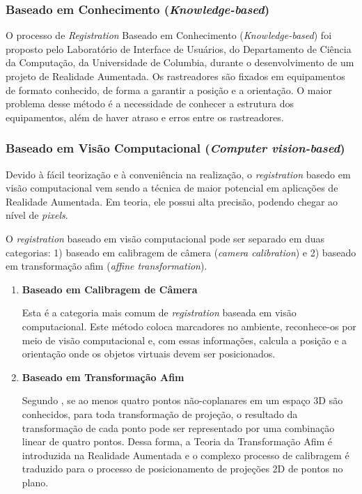 \subsubsection{Baseado em Conhecimento (\textit{Knowledge-based})}


O processo de \textit{Registration} Baseado em Conhecimento (\textit{Knowledge-based}) foi
proposto pelo Laboratório de Interface de Usuários, do Departamento de Ciência da Computação, 
da Universidade de Columbia, durante o desenvolvimento de um projeto de Realidade Aumentada.
Os rastreadores são fixados em equipamentos de formato conhecido, de forma a garantir a posição
e a orientação. O maior problema desse método é a necessidade de conhecer a estrutura dos equipamentos,
além de haver atraso e erros entre os rastreadores.



\subsubsection{Baseado em Visão Computacional (\textit{Computer vision-based})}

Devido à fácil teorização e à conveniência na realização, o \textit{registration} basedo em visão computacional
vem sendo a técnica de maior potencial em aplicações de Realidade Aumentada. Em teoria, ele possui alta precisão,
podendo chegar ao nível de \textit{pixels}.

O \textit{registration} baseado em visão computacional pode ser separado em duas categorias: 1) baseado em
calibragem de câmera (\textit{camera calibration}) e 2) baseado em transformação afim
(\textit{affine transformation}).

\begin{enumerate}
    \item \textbf{Baseado em Calibragem de Câmera}
    
    Esta é a categoria mais comum de \textit{registration} baseada em visão computacional. 
    Este método coloca marcadores no ambiente, reconhece-os por meio de visão computacional e, com essas informações, 
    calcula a posição e a orientação onde os objetos virtuais devem ser posicionados. 


    \item \textbf{Baseado em Transformação Afim}
    
    Segundo \cite{AffineStructure}, se ao menos quatro pontos não-coplanares em um espaço 3D são conhecidos, 
    para toda transformação de projeção, o resultado da transformação de cada ponto pode ser representado por
    uma combinação linear de quatro pontos. Dessa forma, a Teoria da Transformação Afim é introduzida na 
    Realidade Aumentada e o complexo processo de calibragem é traduzido para o processo de posicionamento de
    projeções 2D de pontos no plano.
\end{enumerate}


